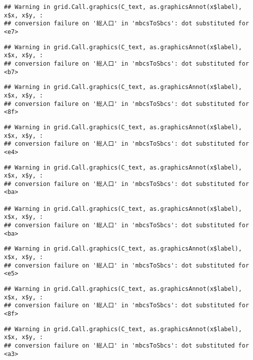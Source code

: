 \documentclass[
]{article}
\begin{document}
\begin{verbatim}
## Warning in grid.Call.graphics(C_text, as.graphicsAnnot(x$label), x$x, x$y, :
## conversion failure on '総人口' in 'mbcsToSbcs': dot substituted for <e7>
\end{verbatim}

\begin{verbatim}
## Warning in grid.Call.graphics(C_text, as.graphicsAnnot(x$label), x$x, x$y, :
## conversion failure on '総人口' in 'mbcsToSbcs': dot substituted for <b7>
\end{verbatim}

\begin{verbatim}
## Warning in grid.Call.graphics(C_text, as.graphicsAnnot(x$label), x$x, x$y, :
## conversion failure on '総人口' in 'mbcsToSbcs': dot substituted for <8f>
\end{verbatim}

\begin{verbatim}
## Warning in grid.Call.graphics(C_text, as.graphicsAnnot(x$label), x$x, x$y, :
## conversion failure on '総人口' in 'mbcsToSbcs': dot substituted for <e4>
\end{verbatim}

\begin{verbatim}
## Warning in grid.Call.graphics(C_text, as.graphicsAnnot(x$label), x$x, x$y, :
## conversion failure on '総人口' in 'mbcsToSbcs': dot substituted for <ba>

## Warning in grid.Call.graphics(C_text, as.graphicsAnnot(x$label), x$x, x$y, :
## conversion failure on '総人口' in 'mbcsToSbcs': dot substituted for <ba>
\end{verbatim}

\begin{verbatim}
## Warning in grid.Call.graphics(C_text, as.graphicsAnnot(x$label), x$x, x$y, :
## conversion failure on '総人口' in 'mbcsToSbcs': dot substituted for <e5>
\end{verbatim}

\begin{verbatim}
## Warning in grid.Call.graphics(C_text, as.graphicsAnnot(x$label), x$x, x$y, :
## conversion failure on '総人口' in 'mbcsToSbcs': dot substituted for <8f>
\end{verbatim}

\begin{verbatim}
## Warning in grid.Call.graphics(C_text, as.graphicsAnnot(x$label), x$x, x$y, :
## conversion failure on '総人口' in 'mbcsToSbcs': dot substituted for <a3>
\end{verbatim}
\end{document}
